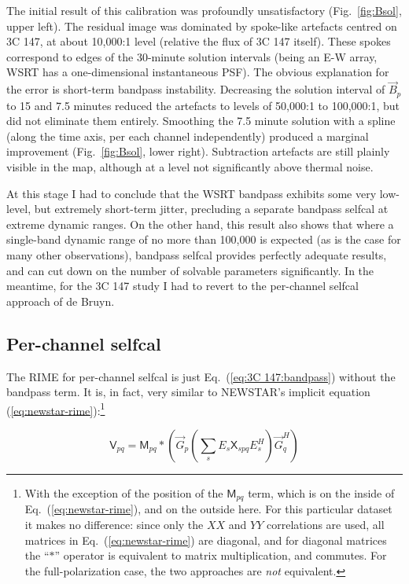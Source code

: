 \documentclass{aa}
\newcommand{\herm}{H}
\newcommand{\jones}[2]{\vec {#1}_{#2}}
\newcommand{\jonesT}[2]{\vec {#1}^{\herm}_{#2}}
\newcommand{\coh}[2]{\mathsf{{#1}}_{{#2}}}
\begin{document}
The initial result of this calibration was profoundly unsatisfactory (Fig.~\ref{fig:Bsol}, upper left). The residual image was dominated by spoke-like artefacts centred on 3C 147, at about 10,000:1 level (relative the flux of 3C 147 itself). These spokes correspond to edges of the 30-minute solution intervals (being an E-W array, WSRT has a one-dimensional instantaneous PSF). The obvious explanation for the error is short-term bandpass instability. Decreasing the solution interval of $\jones{B}{p}$ to 15 and 7.5 minutes reduced the artefacts to levels of 50,000:1 to 100,000:1, but did not eliminate them entirely. Smoothing the 7.5 minute solution with a spline (along the time axis, per each channel independently) produced a marginal improvement (Fig.~\ref{fig:Bsol}, lower right). Subtraction artefacts are still plainly visible in the map, although at a level not significantly above thermal noise.

At this stage I had to conclude that the WSRT bandpass exhibits some very low-level, but extremely short-term jitter, precluding a separate bandpass selfcal at extreme dynamic ranges. On the other hand, this result also shows that where a single-band dynamic range of no more than 100,000 is expected (as is the case for many other observations), bandpass selfcal provides perfectly adequate results, and can cut down on the number of solvable parameters significantly. In the meantime, for the 3C 147 study I had to revert to the per-channel selfcal approach of de Bruyn.

\subsection{Per-channel selfcal}

The RIME for per-channel selfcal is just Eq.~(\ref{eq:3C 147:bandpass}) without the bandpass term. It is, in fact, very similar to NEWSTAR's implicit equation (\ref{eq:newstar-rime}):\footnote{With the exception of the position of the $\coh{M}{pq}$ term, which is on the inside of Eq.~(\ref{eq:newstar-rime}), and on the outside here. For this particular dataset it makes no difference: since only the $XX$ and $YY$ correlations are used, all matrices in Eq.~(\ref{eq:newstar-rime}) are diagonal, and for diagonal matrices the ``$\ast$'' operator is equivalent to matrix multiplication, and commutes. For the full-polarization case, the two approaches are \emph{not} equivalent.}
 
\begin{equation}\label{eq:3C 147:perchan}
\coh{V}{pq} = \coh{M}{pq} \ast \left ( \jones{G}{p} \left( \sum_s E_s \coh{X}{spq} E^{\herm}_s \right)  \jonesT{G}{q} \right )
\end{equation}
\end{document}
